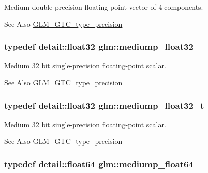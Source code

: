 Medium double-\/precision floating-\/point vector of 4 components. \begin{DoxySeeAlso}{See Also}
\hyperlink{group__gtc__type__precision}{G\-L\-M\-\_\-\-G\-T\-C\-\_\-type\-\_\-precision} 
\end{DoxySeeAlso}
\hypertarget{group__gtc__type__precision_ga1b5f74cbeed0c9d42cd57d77609be7ee}{
\subsubsection[{mediump\-\_\-float32}]{\setlength{\rightskip}{0pt plus 5cm}typedef detail\-::float32 {\bf glm\-::mediump\-\_\-float32}}}\label{group__gtc__type__precision_ga1b5f74cbeed0c9d42cd57d77609be7ee}
Medium 32 bit single-\/precision floating-\/point scalar. \begin{DoxySeeAlso}{See Also}
\hyperlink{group__gtc__type__precision}{G\-L\-M\-\_\-\-G\-T\-C\-\_\-type\-\_\-precision} 
\end{DoxySeeAlso}
\hypertarget{group__gtc__type__precision_gacbd406715148db96c9d9d2a2ef6460de}{
\subsubsection[{mediump\-\_\-float32\-\_\-t}]{\setlength{\rightskip}{0pt plus 5cm}typedef detail\-::float32 {\bf glm\-::mediump\-\_\-float32\-\_\-t}}}\label{group__gtc__type__precision_gacbd406715148db96c9d9d2a2ef6460de}
Medium 32 bit single-\/precision floating-\/point scalar. \begin{DoxySeeAlso}{See Also}
\hyperlink{group__gtc__type__precision}{G\-L\-M\-\_\-\-G\-T\-C\-\_\-type\-\_\-precision} 
\end{DoxySeeAlso}
\hypertarget{group__gtc__type__precision_ga9225ae6aed0f90b6eb65bf8d466199c1}{
\subsubsection[{mediump\-\_\-float64}]{\setlength{\rightskip}{0pt plus 5cm}typedef detail\-::float64 {\bf glm\-::mediump\-\_\-float64}}}\label{group__gtc__type__precision_ga9225ae6aed0f90b6eb65bf8d466199c1}
